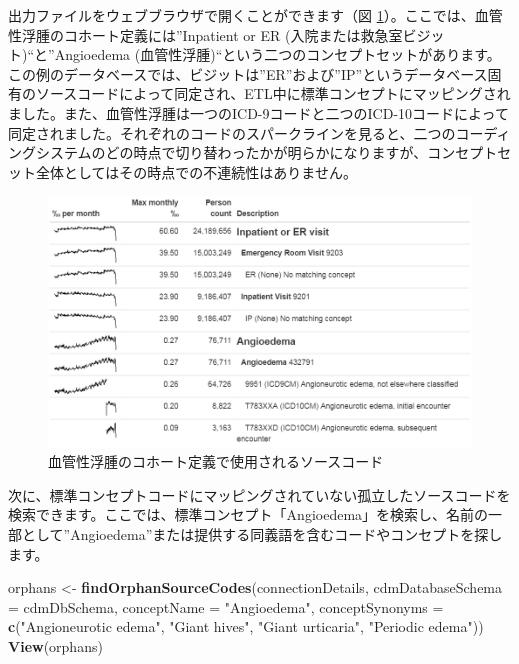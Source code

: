 \documentclass[
  11pt]{book}
\newenvironment{Shaded}{\begin{snugshade}}{\end{snugshade}}
\newcommand{\AttributeTok}[1]{\textcolor[rgb]{0.13,0.29,0.53}{#1}}
\newcommand{\FunctionTok}[1]{\textcolor[rgb]{0.13,0.29,0.53}{\textbf{#1}}}
\newcommand{\NormalTok}[1]{#1}
\newcommand{\OtherTok}[1]{\textcolor[rgb]{0.56,0.35,0.01}{#1}}
\newcommand{\StringTok}[1]{\textcolor[rgb]{0.31,0.60,0.02}{#1}}
\theoremstyle{definition}
\theoremstyle{definition}
\theoremstyle{definition}
\theoremstyle{definition}
\theoremstyle{remark}
\begin{document}
出力ファイルをウェブブラウザで開くことができます（図 \ref{fig:sourceCodesAngioedema}）。ここでは、血管性浮腫のコホート定義には''Inpatient or ER (入院または救急室ビジット)``と''Angioedema (血管性浮腫)``という二つのコンセプトセットがあります。この例のデータベースでは、ビジットは''ER''および''IP''というデータベース固有のソースコードによって同定され、ETL中に標準コンセプトにマッピングされました。また、血管性浮腫は一つのICD-9コードと二つのICD-10コードによって同定されました。それぞれのコードのスパークラインを見ると、二つのコーディングシステムのどの時点で切り替わったかが明らかになりますが、コンセプトセット全体としてはその時点での不連続性はありません。

\begin{figure}

{\centering \includegraphics[width=1\linewidth]{images/DataQuality/sourceCodesAngioedema} 

}

\caption{血管性浮腫のコホート定義で使用されるソースコード}\label{fig:sourceCodesAngioedema}
\end{figure}

次に、標準コンセプトコードにマッピングされていない孤立したソースコードを検索できます。ここでは、標準コンセプト「Angioedema」を検索し、名前の一部として''Angioedema''または提供する同義語を含むコードやコンセプトを探します。

\begin{Shaded}
\begin{Highlighting}[]
\NormalTok{orphans }\OtherTok{\textless{}{-}} \FunctionTok{findOrphanSourceCodes}\NormalTok{(connectionDetails,}
                                 \AttributeTok{cdmDatabaseSchema =}\NormalTok{ cdmDbSchema,}
                                 \AttributeTok{conceptName =} \StringTok{"Angioedema"}\NormalTok{,}
                                 \AttributeTok{conceptSynonyms =} \FunctionTok{c}\NormalTok{(}\StringTok{"Angioneurotic edema"}\NormalTok{,}
                                                     \StringTok{"Giant hives"}\NormalTok{,}
                                                     \StringTok{"Giant urticaria"}\NormalTok{,}
                                                     \StringTok{"Periodic edema"}\NormalTok{))}
\FunctionTok{View}\NormalTok{(orphans)}
\end{Highlighting}
\end{Shaded}
\end{document}
